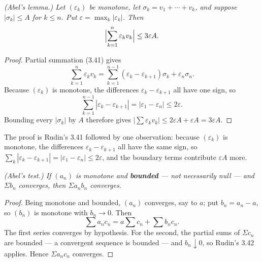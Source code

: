 \emph{(Abel's lemma.) Let $(\varepsilon_k)$ be monotone, let
$\sigma_k = v_1+\cdots+v_k$, and suppose $|\sigma_k| \le A$ for
$k \le n$. Put $\varepsilon = \max_k |\varepsilon_k|$. Then}
\[ \Bigl|\sum_{k=1}^{n} \varepsilon_k v_k\Bigr| \le 3\varepsilon A . \]
\begin{proof}
Partial summation (3.41) gives
\[ \sum_{k=1}^{n} \varepsilon_k v_k
   = \sum_{k=1}^{n-1} (\varepsilon_k - \varepsilon_{k+1})\sigma_k
     + \varepsilon_n \sigma_n . \]
Because $(\varepsilon_k)$ is monotone, the differences
$\varepsilon_k - \varepsilon_{k+1}$ all have one sign, so
\[ \sum_{k=1}^{n-1} |\varepsilon_k-\varepsilon_{k+1}|
   = |\varepsilon_1 - \varepsilon_n| \le 2\varepsilon . \]
Bounding every $|\sigma_k|$ by $A$ therefore gives
$\bigl|\sum \varepsilon_kv_k\bigr| \le 2\varepsilon A + \varepsilon A
= 3\varepsilon A$.
\end{proof}

\noindent
The proof is Rudin's 3.41 followed by one observation: because
$(\varepsilon_k)$ is monotone, the differences
$\varepsilon_k - \varepsilon_{k+1}$ all have the same sign, so
$\sum_k |\varepsilon_k - \varepsilon_{k+1}| = |\varepsilon_1 -
\varepsilon_n| \le 2\varepsilon$, and the boundary terms contribute
$\varepsilon A$ more.

\emph{(Abel's test.) If $(a_n)$ is monotone and \textbf{bounded} --- not
necessarily null --- and $\Sigma b_n$ converges, then $\Sigma a_nb_n$
converges.}
\begin{proof}
Being monotone and bounded, $(a_n)$ converges, say to $a$; put
$b_n = a_n - a$, so $(b_n)$ is monotone with $b_n \to 0$. Then
\[ \sum a_nc_n = a\sum c_n + \sum b_nc_n . \]
The first series converges by hypothesis. For the second, the partial sums of
$\Sigma c_n$ are bounded --- a convergent sequence is bounded --- and
$b_n \downarrow 0$, so Rudin's 3.42 applies. Hence $\Sigma a_nc_n$
converges.
\end{proof}

